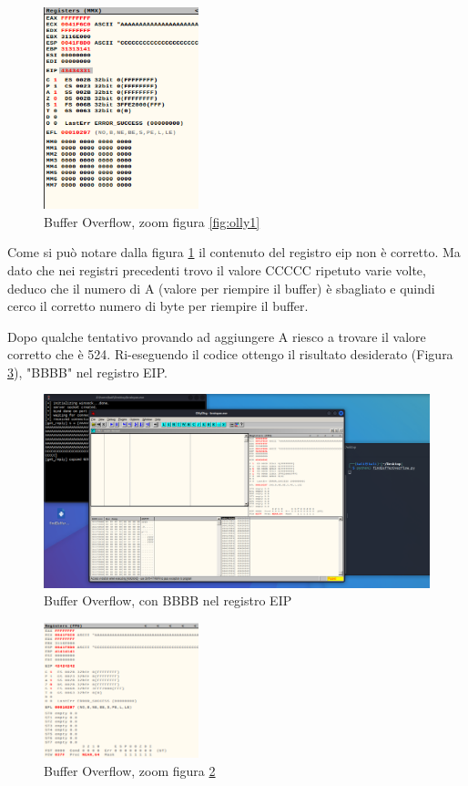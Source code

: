 \documentclass[12pt,letterpaper]{article} %
\begin{document}
\begin{figure}[h!]
  \centering
  \includegraphics[width=0.4\textwidth]{ollydbg2.png}
  \caption{Buffer Overflow, zoom figura \ref{fig:olly1}}
  \label{fig:olly2}
\end{figure}

\noindent Come si può notare dalla figura \ref{fig:olly2} il contenuto del registro eip non è corretto. 
Ma dato che nei registri precedenti trovo il valore CCCCC ripetuto varie volte, deduco che il numero di A (valore per riempire il buffer) è sbagliato e quindi cerco il corretto numero di byte per riempire il buffer.

\noindent Dopo qualche tentativo provando ad aggiungere A  riesco a trovare il valore corretto che è 524. Ri-eseguendo il codice ottengo il risultato desiderato (Figura \ref{fig:olly4}), "BBBB" nel registro EIP. 

\begin{figure}[h!]
  \centering
  \includegraphics[width=\textwidth]{ollydbg3.png}
  \caption{Buffer Overflow, con BBBB nel registro EIP}
  \label{fig:olly3}
\end{figure}

\begin{figure}[h!]
  \centering
  \includegraphics[width=0.4\textwidth]{ollydbg4.png}
  \caption{Buffer Overflow, zoom figura \ref{fig:olly3}}
  \label{fig:olly4}
\end{figure}
\end{document}
